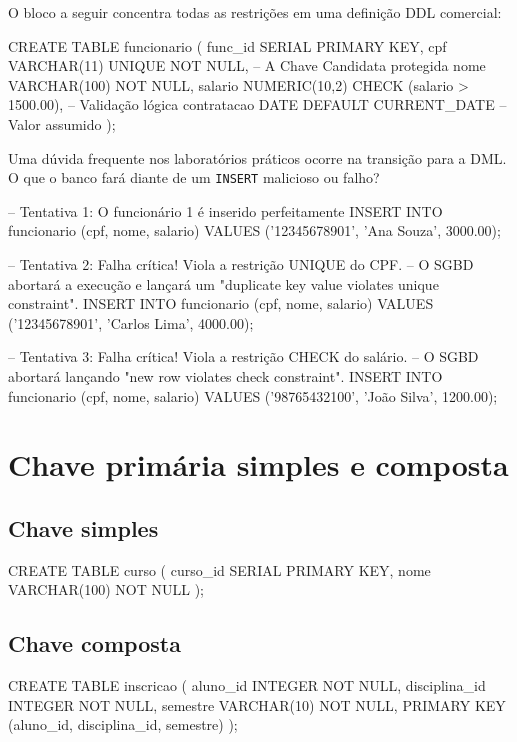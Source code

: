 O bloco a seguir concentra todas as restrições em uma definição DDL comercial:

\begin{sqlcode}
CREATE TABLE funcionario (
    func_id SERIAL PRIMARY KEY,
    cpf VARCHAR(11) UNIQUE NOT NULL,      -- A Chave Candidata protegida
    nome VARCHAR(100) NOT NULL,
    salario NUMERIC(10,2) CHECK (salario > 1500.00), -- Validação lógica
    contratacao DATE DEFAULT CURRENT_DATE            -- Valor assumido
);
\end{sqlcode}

Uma dúvida frequente nos laboratórios práticos ocorre na transição para a DML. O que o banco fará diante de um \texttt{INSERT} malicioso ou falho?

\begin{sqlcode}
-- Tentativa 1: O funcionário 1 é inserido perfeitamente
INSERT INTO funcionario (cpf, nome, salario) 
VALUES ('12345678901', 'Ana Souza', 3000.00);

-- Tentativa 2: Falha crítica! Viola a restrição UNIQUE do CPF.
-- O SGBD abortará a execução e lançará um "duplicate key value violates unique constraint".
INSERT INTO funcionario (cpf, nome, salario) 
VALUES ('12345678901', 'Carlos Lima', 4000.00);

-- Tentativa 3: Falha crítica! Viola a restrição CHECK do salário.
-- O SGBD abortará lançando "new row violates check constraint".
INSERT INTO funcionario (cpf, nome, salario) 
VALUES ('98765432100', 'João Silva', 1200.00);
\end{sqlcode}

\section{Chave primária simples e composta}

\subsection{Chave simples}

\begin{sqlcode}
CREATE TABLE curso (
    curso_id SERIAL PRIMARY KEY,
    nome VARCHAR(100) NOT NULL
);
\end{sqlcode}

\subsection{Chave composta}

\begin{sqlcode}
CREATE TABLE inscricao (
    aluno_id INTEGER NOT NULL,
    disciplina_id INTEGER NOT NULL,
    semestre VARCHAR(10) NOT NULL,
    PRIMARY KEY (aluno_id, disciplina_id, semestre)
);
\end{sqlcode}

